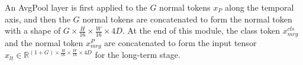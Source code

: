 An AvgPool layer is first applied to the $G$ normal tokens $x_{P}$ along the temporal axis, and then the $G$ normal tokens are concatenated to form the normal token with a shape of $G \times \frac{H}{16} \times \frac{W}{16} \times 4D$. At the end of this module, the class token $x^{cls}_{mrg}$ and the normal token $x^{P}_{mrg}$ are concatenated to form the input tensor $x_{lt} \in \mathbb{R}^{(1+G) \times \frac{H}{16} \times \frac{W}{16} \times 4D}$ for the long-term stage. 